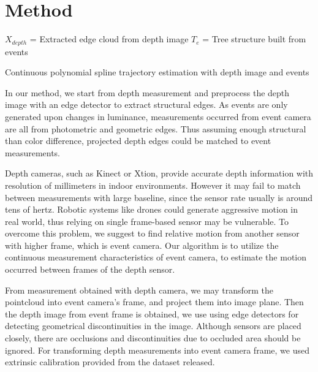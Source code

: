 \section{Method}
\label{sec:method}

\begin{algorithm}[!b]
\SetAlgoLined
	$\ $\\
	$X_{depth}$ = Extracted edge cloud from depth image\;
	$T_e$ = Tree structure built from events\;
	$\ $\\
	\caption{Continuous polynomial spline trajectory estimation with
		depth image and events}
\end{algorithm}

In our method, we start from depth measurement and preprocess the depth image with
an edge detector to extract structural edges. As events are only generated upon
changes in luminance, measurements occurred from event camera are all from photometric
and geometric edges. Thus assuming enough structural than color difference, projected
depth edges could be matched to event measurements.

Depth cameras, such as Kinect or Xtion, provide accurate depth information with
resolution of millimeters in indoor environments. However it may fail to match between
measurements with large baseline, since the sensor rate usually is around tens of hertz.
Robotic systems like drones could generate aggressive motion in real world, thus relying
on single frame-based sensor may be vulnerable. To overcome this problem, we suggest to
find relative motion from another sensor with higher frame, which is event camera.
Our algorithm is to utilize the continuous measurement characteristics of event camera,
to estimate the motion occurred between frames of the depth sensor.

From measurement obtained with depth camera, we may transform the pointcloud into
event camera's frame, and project them into image plane. Then the depth image from
event frame is obtained, we use using edge detectors for detecting geometrical
discontinuities in the image. Although sensors are placed closely, there are
occlusions and discontinuities due to occluded area should be ignored. For
transforming depth measurements into event camera frame, we used extrinsic
calibration provided from the dataset released.

